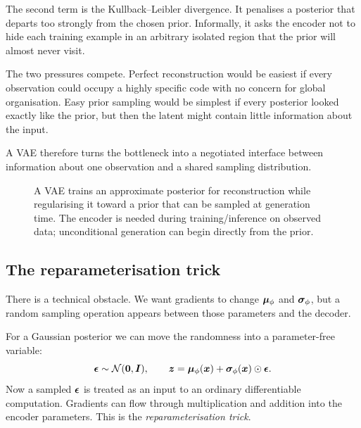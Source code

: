 The second term is the Kullback--Leibler divergence. It penalises a posterior that departs too strongly from the chosen prior. Informally, it asks the encoder not to hide each training example in an arbitrary isolated region that the prior will almost never visit.

The two pressures compete. Perfect reconstruction would be easiest if every observation could occupy a highly specific code with no concern for global organisation. Easy prior sampling would be simplest if every posterior looked exactly like the prior, but then the latent might contain little information about the input.

A VAE therefore turns the bottleneck into a negotiated interface between information about one observation and a shared sampling distribution.

\begin{figure}[ht]
  \caption{A VAE trains an approximate posterior for reconstruction while regularising it toward a prior that can be sampled at generation time. The encoder is needed during training/inference on observed data; unconditional generation can begin directly from the prior.}
  \label{fig:week8-vae}
\end{figure}

\subsection{The reparameterisation trick}

There is a technical obstacle. We want gradients to change \(\bm{\mu}_\phi\) and \(\bm{\sigma}_\phi\), but a random sampling operation appears between those parameters and the decoder.

For a Gaussian posterior we can move the randomness into a parameter-free variable:
\begin{equation}
  \bm{\epsilon}\sim\mathcal{N}(\bm{0},\bm{I}),
  \qquad
  \bm{z}
  = \bm{\mu}_\phi(\bm{x})
    + \bm{\sigma}_\phi(\bm{x})\odot\bm{\epsilon}.
  \label{eq:week8-reparam}
\end{equation}
Now a sampled \(\bm{\epsilon}\) is treated as an input to an ordinary differentiable computation. Gradients can flow through multiplication and addition into the encoder parameters. This is the \emph{reparameterisation trick}.

